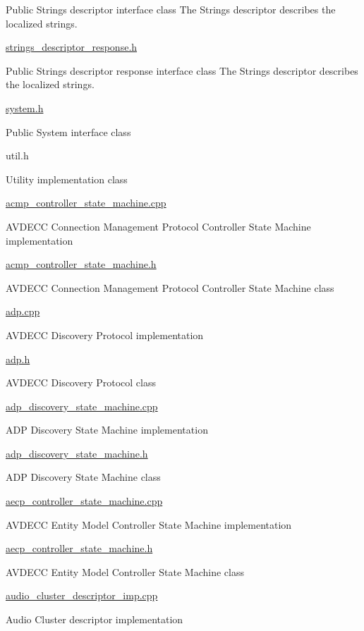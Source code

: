 Public Strings descriptor interface class The Strings descriptor describes the localized strings.

\hyperlink{strings__descriptor__response_8h}{strings\+\_\+descriptor\+\_\+response.\+h}

Public Strings descriptor response interface class The Strings descriptor describes the localized strings.

\hyperlink{system_8h}{system.\+h}

Public System interface class

util.\+h

Utility implementation class

\hyperlink{acmp__controller__state__machine_8cpp}{acmp\+\_\+controller\+\_\+state\+\_\+machine.\+cpp}

A\+V\+D\+E\+CC Connection Management Protocol Controller State Machine implementation

\hyperlink{acmp__controller__state__machine_8h}{acmp\+\_\+controller\+\_\+state\+\_\+machine.\+h}

A\+V\+D\+E\+CC Connection Management Protocol Controller State Machine class

\hyperlink{adp_8cpp}{adp.\+cpp}

A\+V\+D\+E\+CC Discovery Protocol implementation

\hyperlink{adp_8h}{adp.\+h}

A\+V\+D\+E\+CC Discovery Protocol class

\hyperlink{adp__discovery__state__machine_8cpp}{adp\+\_\+discovery\+\_\+state\+\_\+machine.\+cpp}

A\+DP Discovery State Machine implementation

\hyperlink{adp__discovery__state__machine_8h}{adp\+\_\+discovery\+\_\+state\+\_\+machine.\+h}

A\+DP Discovery State Machine class

\hyperlink{aecp__controller__state__machine_8cpp}{aecp\+\_\+controller\+\_\+state\+\_\+machine.\+cpp}

A\+V\+D\+E\+CC Entity Model Controller State Machine implementation

\hyperlink{aecp__controller__state__machine_8h}{aecp\+\_\+controller\+\_\+state\+\_\+machine.\+h}

A\+V\+D\+E\+CC Entity Model Controller State Machine class

\hyperlink{audio__cluster__descriptor__imp_8cpp}{audio\+\_\+cluster\+\_\+descriptor\+\_\+imp.\+cpp}

Audio Cluster descriptor implementation

